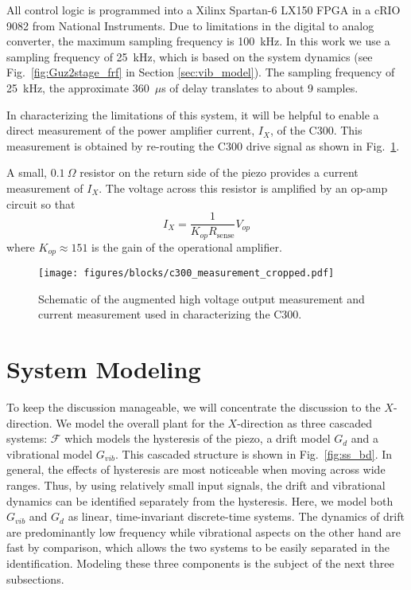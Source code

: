 \documentclass[journal,twocolumn,twoside]{IEEEtran}
\begin{document}
All control logic is programmed into a Xilinx Spartan-6 LX150 FPGA in a cRIO 9082 from National Instruments. Due to limitations in the digital to analog converter, the maximum sampling frequency is 100~kHz. In this work we use a sampling frequency of 25~kHz, which is based on the system dynamics (see Fig.~\ref{fig:Guz2stage_frf} in Section \ref{sec:vib_model}). The sampling frequency of 25~kHz, the approximate 360~$\mu$s of delay translates to about 9 samples.

In characterizing the limitations of this system, it will be helpful to enable a direct measurement of the power amplifier current, $I_X$, of the C300. This measurement is obtained by re-routing the C300 drive signal as shown in Fig.~\ref{fig:c300_meas}. %

A small, $0.1~\Omega$ resistor on the return side of the piezo provides a current measurement of $I_X$. The voltage across this resistor is amplified by an op-amp circuit so that
\begin{equation}
I_{X} = \frac{1}{K_{op}R_{\text{sense}}}V_{op}
\end{equation}
where $K_{op}\approx 151$ is the gain of the operational amplifier.


\begin{figure}
    \texttt{[image: figures/blocks/c300\_measurement\_cropped.pdf]}
    \caption{Schematic of the augmented high voltage output measurement and current measurement used in characterizing the C300.}
    \label{fig:c300_meas}
\end{figure}
\section{System Modeling}

To keep the discussion manageable, we will concentrate the discussion to the $X$-direction. We model the overall plant for the $X$-direction as three cascaded systems: $\mathcal{F}$ which models the hysteresis of the piezo, a drift model $G_d$ and a vibrational model $G_{vib}$. This cascaded structure is shown in Fig.~\ref{fig:ss_bd}. In general, the effects of hysteresis are most noticeable when moving across wide ranges. Thus, by using relatively small input signals, the drift and vibrational dynamics can be identified separately from the hysteresis. Here, we model both $G_{vib}$ and $G_d$ as linear, time-invariant discrete-time systems. The dynamics of drift are predominantly low frequency while vibrational aspects on the other hand are fast by comparison, which allows the two systems to be easily separated in the identification.
 Modeling these three components is the subject of the next three subsections.
\end{document}
